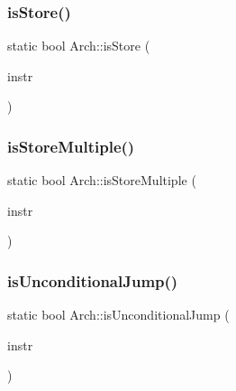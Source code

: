 \mbox{\label{classArch_ab892d0c0ee92b3f04d371e84af1c44da}} 
\subsubsection{\texorpdfstring{is\+Store()}{isStore()}}
{\footnotesize\ttfamily static bool Arch\+::is\+Store (\begin{DoxyParamCaption}\item[{const string \&}]{instr }\end{DoxyParamCaption})\hspace{0.3cm}{\ttfamily [static]}}

\mbox{\label{classArch_a54f415f6f7c8adbc0cbd0a48f57f4fb1}} 
\subsubsection{\texorpdfstring{is\+Store\+Multiple()}{isStoreMultiple()}}
{\footnotesize\ttfamily static bool Arch\+::is\+Store\+Multiple (\begin{DoxyParamCaption}\item[{const string \&}]{instr }\end{DoxyParamCaption})\hspace{0.3cm}{\ttfamily [static]}}

\mbox{\label{classArch_a852783c61c3b3c8d5b1025938fb59694}} 
\subsubsection{\texorpdfstring{is\+Unconditional\+Jump()}{isUnconditionalJump()}}
{\footnotesize\ttfamily static bool Arch\+::is\+Unconditional\+Jump (\begin{DoxyParamCaption}\item[{const \hyperlink{classObjdumpInstruction}{Objdump\+Instruction} \&}]{instr }\end{DoxyParamCaption})\hspace{0.3cm}{\ttfamily [static]}}

\mbox{\label{classArch_aae45fad85b266ebdddeca74db6dc7757}} 
